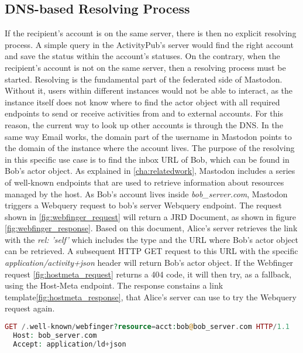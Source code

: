 \subsection{DNS-based Resolving Process}
If the recipient's account is on the same server, there is then no explicit resolving process. A simple query in the ActivityPub's server would find the right account and save the status within the account's statuses. On the contrary, when the recipient's account is not on the same server, then a resolving process must be started. Resolving is the fundamental part of the federated side of Mastodon. Without it, users within different instances would not be able to interact, as the instance itself does not know where to find the actor object with all required endpoints to send or receive activities from and to external accounts. For this reason, the current way to look up other accounts is through the DNS. In the same way Email works, the domain part of the username in Mastodon points to the domain of the instance where the account lives. The purpose of the resolving in this specific use case is to find the inbox URL of Bob, which can be found in Bob's actor object. As explained in \autoref{cha:relatedwork}, Mastodon includes a series of well-known endpoints that are used to retrieve information about resources managed by the host. As Bob's account lives inside \emph{bob\_server.com}, Mastodon triggers a Webquery request to bob's server Webquery endpoint. The request shown in \ref{fig:webfinger_request} will return a JRD Document, as shown in figure \ref{fig:webfinger_response}. Based on this document, Alice's server retrieves the link with the \emph{rel: 'self'} which includes the type and the URL where Bob's actor object can be retrieved. A subsequent HTTP GET request to this URL with the specific \emph{application/activity+json} header will return Bob's actor object. If the Webfinger request \ref{fig:hostmeta_request} returns a 404 code, it will then try, as a fallback, using the Host-Meta endpoint. The response constains a link template\ref{fig:hostmeta_response}, that Alice's server can use to try the Webquery request again.  

\begin{lstlisting}[language=PHP, caption=Webfinger request, label=fig:webfinger_request]
  GET /.well-known/webfinger?resource=acct:bob@bob_server.com HTTP/1.1
  Host: bob_server.com
  Accept: application/ld+json
\end{lstlisting}

